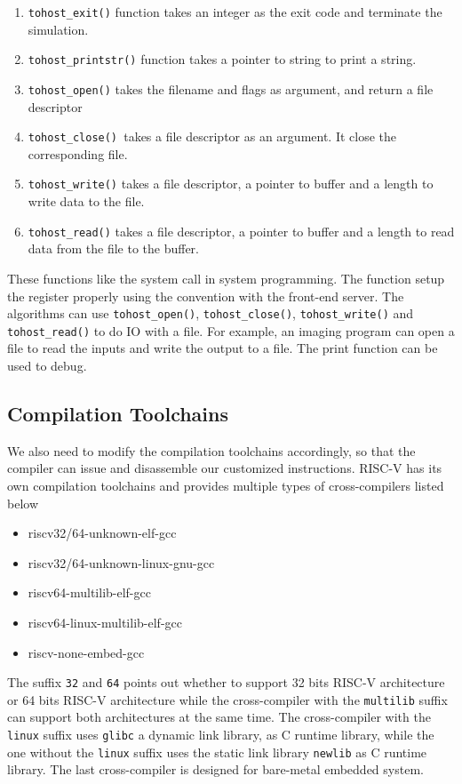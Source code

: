 \begin{enumerate}
    \item \texttt{tohost\_exit()} function takes an integer as the exit code and terminate the simulation.
    \item \texttt{tohost\_printstr()} function takes a pointer to string to print a string.
    \item \texttt{tohost\_open()} takes the filename and flags as argument, and return a file descriptor
    \item \texttt{tohost\_close() }takes a file descriptor as an argument. It close the corresponding file.
    \item \texttt{tohost\_write()} takes a file descriptor, a pointer to buffer and a length to write data to the file.
    \item \texttt{tohost\_read()} takes a file descriptor, a pointer to buffer and a length to read data from the file to the buffer.
\end{enumerate}

These functions like the system call in system programming. The function setup the register properly using the convention with the front-end server. The algorithms can use \texttt{tohost\_open()}, \texttt{tohost\_close()}, \texttt{tohost\_write()} and \texttt{tohost\_read()} to do IO with a file. For example, an imaging program can open a file to read the inputs and write the output to a file. The print function can be used to debug.

\subsection{Compilation Toolchains} %
We also need to modify the compilation toolchains accordingly, so that the compiler can issue and disassemble our customized instructions. RISC-V has its own compilation toolchains and provides multiple types of cross-compilers listed below 
\begin{itemize}
    \item riscv32/64-unknown-elf-gcc
    \item riscv32/64-unknown-linux-gnu-gcc
    \item riscv64-multilib-elf-gcc
    \item riscv64-linux-multilib-elf-gcc
    \item riscv-none-embed-gcc
\end{itemize}

The suffix \texttt{32} and \texttt{64} points out whether to support 32 bits RISC-V architecture or 64 bits RISC-V architecture while the cross-compiler with the \texttt{multilib} suffix can support both architectures at the same time. The cross-compiler with the \texttt{linux} suffix uses \texttt{glibc} a dynamic link library, as C runtime library, while the one without the \texttt{linux} suffix uses the static link library \texttt{newlib} as C runtime library. The last cross-compiler is designed for bare-metal embedded system. 

